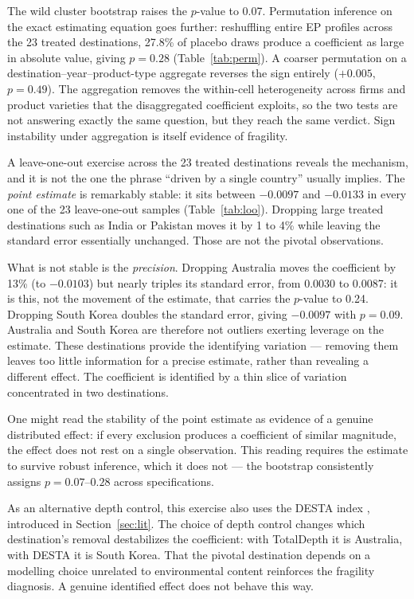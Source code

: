 \documentclass[12pt]{article}
\begin{document}
The wild cluster bootstrap raises the $p$-value to 0.07. Permutation inference on the
exact estimating equation goes further: reshuffling entire EP profiles across the 23
treated destinations, 27.8\% of placebo draws produce a coefficient as large in absolute
value, giving $p = 0.28$ (Table~\ref{tab:perm}). A coarser permutation on a destination--year--product-type
aggregate reverses the sign entirely ($+0.005$, $p = 0.49$). The aggregation removes the
within-cell heterogeneity across firms and product varieties that the disaggregated
coefficient exploits, so the two tests are not answering exactly the same question, but
they reach the same verdict. Sign instability under aggregation is itself evidence of
fragility.

A leave-one-out exercise across the 23 treated destinations reveals the mechanism, and it
is not the one the phrase ``driven by a single country'' usually implies. The
\emph{point estimate} is remarkably stable: it sits between $-0.0097$ and $-0.0133$ in
every one of the 23 leave-one-out samples (Table~\ref{tab:loo}). Dropping large treated destinations such as
India or Pakistan moves it by 1 to 4\% while leaving the standard error essentially
unchanged. Those are not the pivotal observations.

What is not stable is the \emph{precision}. Dropping Australia moves the coefficient by
13\% (to $-0.0103$) but nearly triples its standard error, from 0.0030 to 0.0087: it is
this, not the movement of the estimate, that carries the $p$-value to 0.24. Dropping
South Korea doubles the standard error, giving $-0.0097$ with $p = 0.09$. Australia and
South Korea are therefore not outliers exerting leverage on the estimate. These destinations provide the identifying variation --- removing them leaves too little information for a precise estimate, rather than revealing a different effect. The coefficient is identified by a thin slice of variation concentrated in two destinations.

One might read the stability of the point estimate as evidence of a genuine distributed effect: if every exclusion produces a coefficient of similar magnitude, the effect does not rest on a single observation. This reading requires the estimate to survive robust inference, which it does not --- the bootstrap consistently assigns $p = 0.07$--$0.28$ across specifications.

As an alternative depth control, this exercise also uses the DESTA index \citep{dur2014}, introduced in Section~\ref{sec:lit}. The choice of depth control changes which destination's removal destabilizes the coefficient: with TotalDepth it is Australia, with DESTA it is South Korea. That the pivotal destination depends on a modelling choice unrelated to environmental content reinforces the fragility diagnosis. A genuine identified effect does not behave this way.
\end{document}
